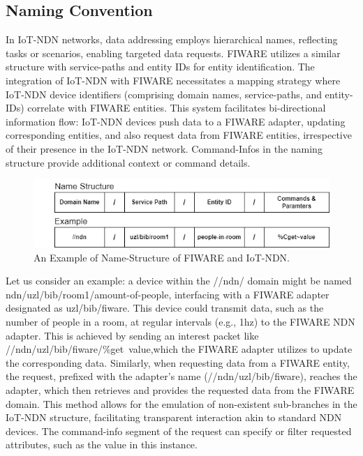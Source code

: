 \documentclass[conference]{IEEEtran}
\begin{document}
\subsection{Naming Convention}
In IoT-NDN networks, data addressing employs hierarchical names, reflecting tasks or scenarios, enabling targeted data requests. \cite[Hail, 2019]{b5}
FIWARE utilizes a similar structure with service-paths and entity IDs for entity identification.
The integration of IoT-NDN with FIWARE necessitates a mapping strategy where IoT-NDN device identifiers (comprising domain names, service-paths, and entity-IDs) correlate with FIWARE entities.
This system facilitates bi-directional information flow: IoT-NDN devices push data to a FIWARE adapter, updating corresponding entities, and also request data from FIWARE entities, irrespective of their presence in the IoT-NDN network.
Command-Infos in the naming structure provide additional context or command details.
\begin{figure}[tb]
    \centerline{\includegraphics[scale=.4]{ndn-example.png}}
    \caption{An Example of Name-Structure of FIWARE and IoT-NDN.}
    \label{ndn-example}
\end{figure}
\vspace{6pt}
Let us consider an example: a device within the //ndn/ domain might be named ndn/uzl/bib/room1/amount-of-people, interfacing with a FIWARE adapter designated as uzl/bib/fiware.
This device could transmit data, such as the number of people in a room, at regular intervals (e.g., 1hz) to the FIWARE NDN adapter.
This is achieved by sending an interest packet like //ndn/uzl/bib/fiware/\%get~value,which the FIWARE adapter utilizes to update the corresponding data.
Similarly, when requesting data from a FIWARE entity, the request, prefixed with the adapter's name (//ndn/uzl/bib/fiware), reaches the adapter, which then retrieves and provides the requested data from the FIWARE domain.
This method allows for the emulation of non-existent sub-branches in the IoT-NDN structure, facilitating transparent interaction akin to standard NDN devices.
The command-info segment of the request can specify or filter requested attributes, such as the value in this instance.
\end{document}
